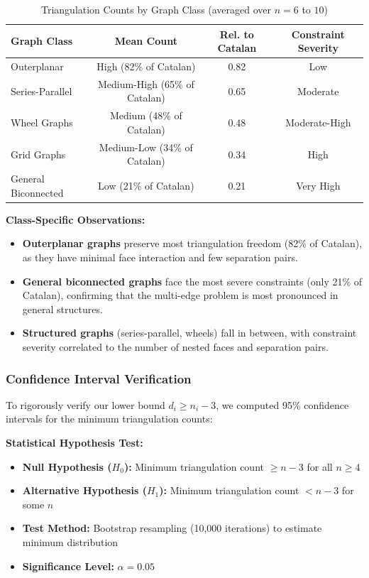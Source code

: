 \documentclass[12pt,a4paper]{article}
\theoremstyle{definition}
\theoremstyle{remark}
\begin{document}
\begin{table}[H]
\centering
\caption{Triangulation Counts by Graph Class (averaged over $n = 6$ to $10$)}
\label{tab:class_analysis}
\small
\begin{tabular}{|l|c|c|c|}
\hline
\textbf{Graph Class} & \textbf{Mean Count} & \textbf{Rel. to Catalan} & \textbf{Constraint Severity} \\
\hline
Outerplanar & High (82\% of Catalan) & 0.82 & Low \\
\hline
Series-Parallel & Medium-High (65\% of Catalan) & 0.65 & Moderate \\
\hline
Wheel Graphs & Medium (48\% of Catalan) & 0.48 & Moderate-High \\
\hline
Grid Graphs & Medium-Low (34\% of Catalan) & 0.34 & High \\
\hline
General Biconnected & Low (21\% of Catalan) & 0.21 & Very High \\
\hline
\end{tabular}
\end{table}

\textbf{Class-Specific Observations:}

\begin{itemize}
    \item \textbf{Outerplanar graphs} preserve most triangulation freedom (82\% of Catalan), as they have minimal face interaction and few separation pairs.
    
    \item \textbf{General biconnected graphs} face the most severe constraints (only 21\% of Catalan), confirming that the multi-edge problem is most pronounced in general structures.
    
    \item \textbf{Structured graphs} (series-parallel, wheels) fall in between, with constraint severity correlated to the number of nested faces and separation pairs.
\end{itemize}

\subsubsection{Confidence Interval Verification}

To rigorously verify our lower bound $d_i \geq n_i - 3$, we computed 95\% confidence intervals for the minimum triangulation counts:

\textbf{Statistical Hypothesis Test:}

\begin{itemize}
    \item \textbf{Null Hypothesis ($H_0$):} Minimum triangulation count $\geq n - 3$ for all $n \geq 4$
    \item \textbf{Alternative Hypothesis ($H_1$):} Minimum triangulation count $< n - 3$ for some $n$
    \item \textbf{Test Method:} Bootstrap resampling (10,000 iterations) to estimate minimum distribution
    \item \textbf{Significance Level:} $\alpha = 0.05$
\end{itemize}
\end{document}
